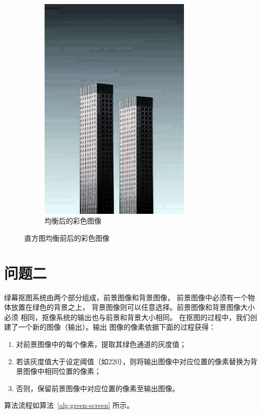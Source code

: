 \documentclass[UTF8]{article}
\begin{document}
\begin{figure}[htbp]
\begin{subfigure}{0.45\textwidth}
      \includegraphics[width=0.8\textwidth]{img/equalized_img.jpg}
      \caption{均衡后的彩色图像}
      \label{fig:equalized_img} %
    \end{subfigure}
    \caption{直方图均衡前后的彩色图像}
    \label{fig:前后} %
\end{figure}
\section{问题二}
绿幕抠图系统由两个部分组成，前景图像和背景图像，
前景图像中必须有一个物体放置在绿色的背景之上，
背景图像则可以任意选择。前景图像和背景图像大小必须
相同，抠像系统的输出也与前景和背景大小相同。
在抠图的过程中，我们创建了一个新的图像（输出）。输出
图像的像素依据下面的过程获得：
\begin{enumerate} 
    \item 对前景图像中的每个像素，提取其绿色通道的灰度值； 
    \item 若该灰度值大于设定阈值（如220），则将输出图像中对应位置的像素替换为背景图像中相同位置的像素； 
    \item 否则，保留前景图像中对应位置的像素至输出图像。 
\end{enumerate}
算法流程如算法~\ref{alg:green-screen} 所示。
\end{document}
